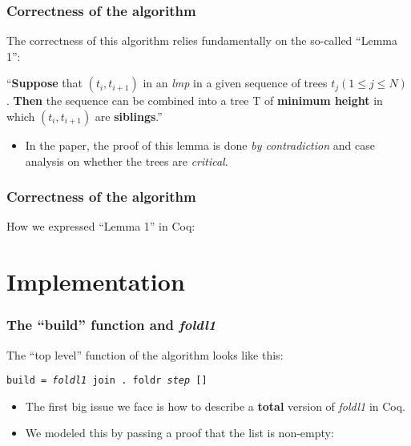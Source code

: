 \documentclass{beamer}
\begin{document}
        \begin{frame}
            \frametitle{Correctness of the algorithm}
            The correctness of this algorithm relies fundamentally on the so-called
            ``Lemma 1'':

            \vspace{0.5cm}

            ``\textbf{Suppose} that $(t_{i}, t_{i+1})$ in an \emph{lmp} in a given
            sequence of trees $t_{j} (1 \leq j \leq N)$. \textbf{Then} the sequence
            can be combined into a tree T of \textbf{minimum height} in which
            $(t_{i}, t_{i+1})$ are \textbf{siblings}.''

            \pause
            \begin{itemize}
                \item In the paper, the proof of this lemma is done
                    \emph{by contradiction} and case analysis on whether the
                    trees are \emph{critical}.
            \end{itemize}
        \end{frame}

        \begin{frame}
            \frametitle{Correctness of the algorithm}
            How we expressed ``Lemma 1'' in Coq:
            \vspace{0.5cm}

            \coqLemma
            \coqSiblings
            \coqMinimum
        \end{frame}


    \section{Implementation}
    \label{sec:implementation}
        \begin{frame}
            \frametitle{The ``build'' function and \emph{foldl1}}
            The ``top level'' function of the algorithm looks like this:

            \vspace{0.5cm}
            \texttt{build = \emph{foldl1} join . foldr \emph{step} []}
            \vspace{0.5cm}

            \begin{itemize}
                \item The first big issue we face is how to describe a \textbf{total}
                    version of \emph{foldl1} in Coq.
                \pause
                \item We modeled this by passing a proof that the list is non-empty:
                    \coqFoldl
            \end{itemize}

        \end{frame}
\end{document}
